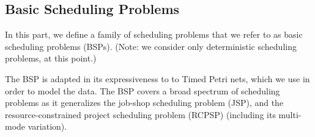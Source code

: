 \documentclass[11pt]{article}
\begin{document}
%


%
%


%
%
%
%
%
%


\subsection{Basic Scheduling Problems}
 
In this part, we define
a family of scheduling problems that we
refer to as basic scheduling problems (BSPs). (Note: we consider only deterministic
scheduling problems, at this point.)

The BSP is adapted in its expressiveness to 
to Timed Petri nets, which we use in order
to model the data. The BSP covers a broad spectrum of scheduling problems as it 
generalizes the 
job-shop scheduling problem (JSP), 
and the resource-constrained project scheduling problem (RCPSP) (including its multi-mode variation).
\end{document}
